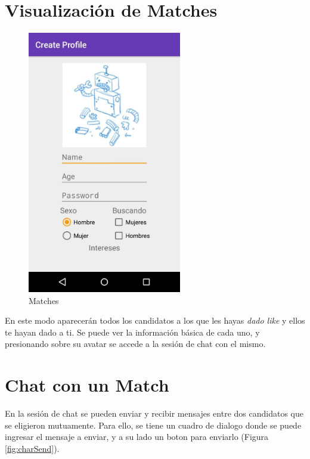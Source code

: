 \documentclass[10pt,letterpaper,extrafontsizes]{memoir}
\begin{document}
\newpage
\section{Visualización de Matches}

\begin{figure}[H]
    \centering
\includegraphics[width=0.6\textwidth]{graficos/capturas/i}
    \caption{Matches}
    \label{fig:matchesp}
\end{figure}

En este modo aparecerán todos los candidatos a los que les hayas \emph{dado like} y ellos te hayan dado a ti. Se puede ver la información básica de cada uno, y presionando sobre su avatar se accede a la sesión de chat con el mismo.

\section{Chat con un Match}

En la sesión de chat se pueden enviar y recibir mensajes entre dos candidatos que se eligieron mutuamente. Para ello, se tiene un cuadro de dialogo donde se puede ingresar el mensaje a enviar, y a su lado un boton para enviarlo (Figura \ref{fig:charSend}).
\end{document}
